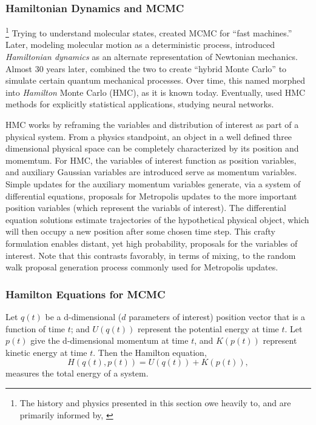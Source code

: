 \subsubsection{Hamiltonian Dynamics and MCMC} %

\footnote{The history and physics presented in this section owe heavily to, and are primarily informed by, \citep{Neal2011}} Trying to understand molecular states, \cite{Metropolis1953} created MCMC for ``fast machines.'' Later, modeling molecular motion as a deterministic process, \cite{Alder1959} introduced {\it Hamiltonian dynamics} as an alternate representation of Newtonian mechanics. Almost 30 years later, \cite{Duane1987} combined the two to create ``hybrid Monte Carlo'' to simulate certain quantum mechanical processes. Over time, this named morphed into {\it Hamilton} Monte Carlo (HMC), as it is known today. Eventually, \cite{Neal1996} used HMC methods for explicitly statistical applications, studying neural networks.

HMC works by reframing the variables and distribution of interest as part of a physical system. From a physics standpoint, an object in a well defined three dimensional physical space can be completely characterized by its position and momemtum. For HMC, the variables of interest function as position variables, and auxiliary Gaussian variables are introduced serve as momentum variables. Simple updates for the auxiliary momentum variables generate, via a system of differential equations, proposals for Metropolis updates to the more important position variables (which represent the variabls of interest). The differential equation solutions estimate trajectories of the hypothetical physical object, which will then occupy a new position after some chosen time step. This crafty formulation enables distant, yet high probability, proposals for the variables of interest. Note that this contrasts favorably, in terms of mixing, to the random walk proposal generation process commonly used for Metropolis updates.

\subsubsection{Hamilton Equations for MCMC} %

Let $q(t)$ be a d-dimensional ($d$ parameters of interest) position vector that is a function of time $t$; and $U(q(t))$ represent the potential energy at time $t$. Let $p(t)$ give the d-dimensional momentum at time $t$, and $K(p(t))$ represent kinetic energy at time $t$. Then the Hamilton equation,
\begin{equation}
H(q(t),p(t)) = U(q(t)) + K(p(t)),
\end{equation}
measures the total energy of a system. 


